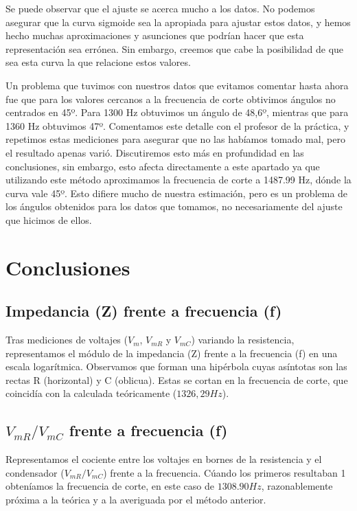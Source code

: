 \documentclass[12pt, a4paper, titlepage]{article}
\begin{document}
  Se puede observar que el ajuste se acerca mucho a los datos. No podemos asegurar que la curva sigmoide sea la apropiada para ajustar estos datos, y hemos hecho muchas aproximaciones y asunciones que podrían hacer que esta representación sea errónea. Sin embargo, creemos que cabe la posibilidad de que sea esta curva la que relacione estos valores.

  Un problema que tuvimos con nuestros datos que evitamos comentar hasta ahora fue que para los valores cercanos a la frecuencia de corte obtivimos ángulos no centrados en 45º. Para 1300 Hz obtuvimos un ángulo de 48,6º, mientras que para 1360 Hz obtuvimos 47º. Comentamos este detalle con el profesor de la práctica, y repetimos estas mediciones para asegurar que no las habíamos tomado mal, pero el resultado apenas varió. Discutiremos esto más en profundidad en las conclusiones, sin embargo, esto afecta directamente a este apartado ya que utilizando este método aproximamos la frecuencia de corte a 1487.99 Hz, dónde la curva vale 45º. Esto difiere mucho de nuestra estimación, pero es un problema de los ángulos obtenidos para los datos que tomamos, no necesariamente del ajuste que hicimos de ellos.


  \newpage
  \section{Conclusiones}

  \subsection{Impedancia (Z) frente a frecuencia (f)}

  Tras mediciones de voltajes ($V_m$, $V_{mR}$ y $V_{mC}$) variando la resistencia, representamos el módulo de la impedancia (Z) frente a la frecuencia (f) en una escala logarítmica. Observamos que forman una hipérbola cuyas asíntotas son las rectas R (horizontal) y C (oblicua). Estas se cortan en la frecuencia de corte, que coincidía con la calculada teóricamente ($1326, 29 Hz$).

  \subsection{$V_{mR}/V_{mC}$ frente a frecuencia (f)}

  Representamos el cociente entre los voltajes en bornes de la resistencia y el condensador ($V_{mR}/V_{mC}$) frente a la frecuencia. Cúando los primeros resultaban 1 obteníamos la frecuencia de corte, en este caso de $1308.90 Hz$, razonablemente próxima a la teórica y a la averiguada por el método anterior.
\end{document}
